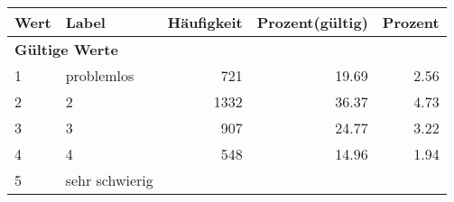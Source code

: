      \begin{longtable}{lXrrr}
     \toprule
     \textbf{Wert} & \textbf{Label} & \textbf{Häufigkeit} & \textbf{Prozent(gültig)} & \textbf{Prozent} \\
     \endhead
     \midrule
     \multicolumn{5}{l}{\textbf{Gültige Werte}}\\

     1 &
     \multicolumn{1}{X}{ problemlos   } &


       \num{721} &
       \num[round-mode=places,round-precision=2]{19,69} &
         \num[round-mode=places,round-precision=2]{2,56} \\

     2 &
     \multicolumn{1}{X}{ 2   } &


       \num{1332} &
       \num[round-mode=places,round-precision=2]{36,37} &
         \num[round-mode=places,round-precision=2]{4,73} \\

     3 &
     \multicolumn{1}{X}{ 3   } &


       \num{907} &
       \num[round-mode=places,round-precision=2]{24,77} &
         \num[round-mode=places,round-precision=2]{3,22} \\

     4 &
     \multicolumn{1}{X}{ 4   } &


       \num{548} &
       \num[round-mode=places,round-precision=2]{14,96} &
         \num[round-mode=places,round-precision=2]{1,94} \\

     5 &
     \multicolumn{1}{X}{ sehr schwierig   } &



\end{longtable}
